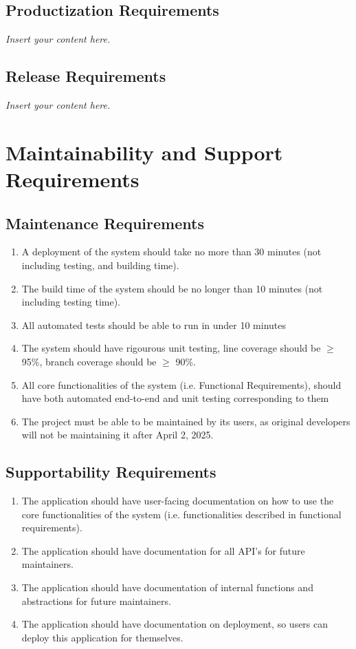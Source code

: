 \documentclass[12pt]{article}
\newcommand{\lips}{\textit{Insert your content here.}}
\begin{document}
\subsection{Productization Requirements}
\lips
\subsection{Release Requirements}
\lips

\section{Maintainability and Support Requirements}
\subsection{Maintenance Requirements}
\begin{enumerate} [{MS-MTN}1.]
  \item A deployment of the system should take no more than 30 minutes (not
  including testing, and building time).
  \item The build time of the system should be no longer than 10 minutes (not
  including testing time).
  \item All automated tests should be able to run in under 10 minutes
  \item The system should have rigourous unit testing, line coverage should be
  $\ge$ 95\%, branch coverage should be $\ge$ 90\%.
  \item All core functionalities of the system (i.e. Functional Requirements),
  should have both automated end-to-end and unit testing corresponding to them
  \item The project must be able to be maintained by its users, as original
  developers will not be maintaining it after April 2, 2025.
\end{enumerate}
\subsection{Supportability Requirements}
\begin{enumerate} [{MS-SUP}1.]
  \item The application should have user-facing documentation on how to use the
  core functionalities of the system (i.e. functionalities described in
  functional requirements).
  \item The application should have documentation for all API's for future
  maintainers.
  \item The application should have documentation of internal functions and 
  abstractions for future maintainers.
  \item The application should have documentation on deployment, so users can
  deploy this application for themselves.
\end{enumerate}
\end{document}
